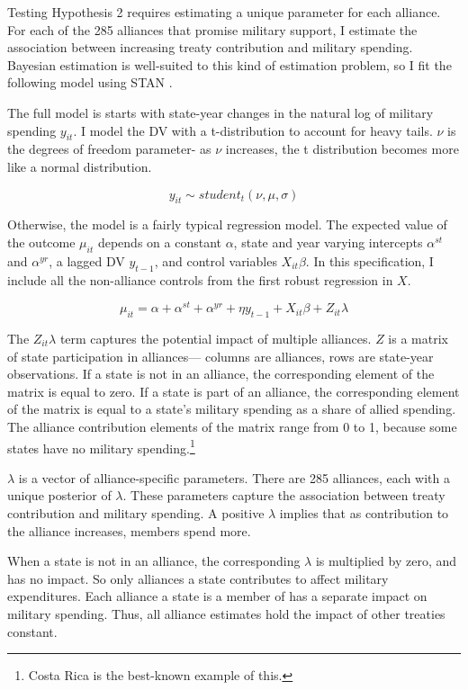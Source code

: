 \documentclass[12pt]{article}
\begin{document}
Testing Hypothesis 2 requires estimating a unique parameter for each alliance.
For each of the 285 alliances that promise military support, I estimate the association between increasing treaty contribution and military spending. 
Bayesian estimation is well-suited to this kind of estimation problem, so I fit the following model using STAN \citep{Carpenteretal2016}.

The full model is starts with state-year changes in the natural log of military spending $y_{it}$.
I model the DV with a t-distribution to account for heavy tails.
$\nu$ is the degrees of freedom parameter- as $\nu$ increases, the t distribution becomes more like a normal distribution. 


\begin{equation}
y_{it} \sim student_t(\nu, \mu, \sigma) 
\end{equation}


Otherwise, the model is a fairly typical regression model.
The expected value of the outcome $\mu_{it}$ depends on a constant $\alpha$, state and year varying intercepts $\alpha^{st}$ and $\alpha^{yr}$, a lagged DV $y_{t-1}$, and control variables $X_{it} \beta$. 
In this specification, I include all the non-alliance controls from the first robust regression in $X$.


\begin{equation}
\mu_{it} = \alpha + \alpha^{st} + \alpha^{yr} + \eta y_{t-1} + X_{it} \beta + Z_{it} \lambda 
\end{equation}


The $Z_{it} \lambda$ term captures the potential impact of multiple alliances. 
$Z$ is a matrix of state participation in alliances--- columns are alliances, rows are state-year observations. 
If a state is not in an alliance, the corresponding element of the matrix is equal to zero. 
If a state is part of an alliance, the corresponding element of the matrix is equal to a state's military spending as a share of allied spending. 
The alliance contribution elements of the matrix range from 0 to 1, because some states have no military spending.\footnote{Costa Rica is the best-known example of this.} 


$\lambda$ is a vector of alliance-specific parameters.  
There are 285 alliances, each with a unique posterior of $\lambda$. 
These parameters capture the association between treaty contribution and military spending. 
A positive $\lambda$ implies that as contribution to the alliance increases, members spend more. 


When a state is not in an alliance, the corresponding $\lambda$ is multiplied by zero, and has no impact. 
So only alliances a state contributes to affect military expenditures. 
Each alliance a state is a member of has a separate impact on military spending.
Thus, all alliance estimates hold the impact of other treaties constant.     
\end{document}

